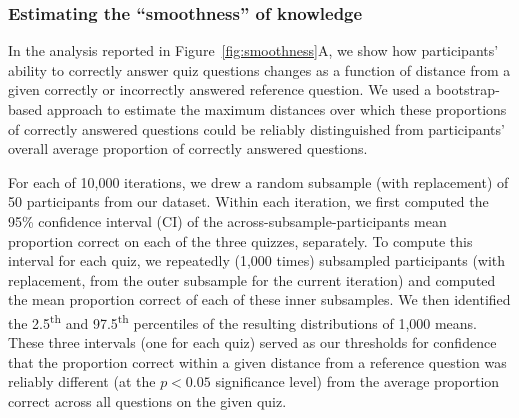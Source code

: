 \documentclass[10pt]{article}
\begin{document}

\subsubsection*{Estimating the ``smoothness'' of knowledge}\label{subsec:smoothness}

In the analysis reported in Figure~\ref{fig:smoothness}A, we show how
participants' ability to correctly answer quiz questions changes as a function
of distance from a given correctly or incorrectly answered reference question.
We used a bootstrap-based approach to estimate the maximum distances over which
these proportions of correctly answered questions could be reliably
distinguished from participants' overall average proportion of correctly
answered questions.

For each of 10,000 iterations, we drew a random subsample (with replacement) of
50 participants from our dataset. Within each iteration, we first computed the
95\% confidence interval (CI) of the across-subsample-participants mean
proportion correct on each of the three quizzes, separately. To compute this
interval for each quiz, we repeatedly (1,000 times) subsampled participants
(with replacement, from the outer subsample for the current iteration) and
computed the mean proportion correct of each of these inner subsamples. We then
identified the 2.5\textsuperscript{th} and 97.5\textsuperscript{th} percentiles
of the resulting distributions of 1,000 means. These three intervals (one for
each quiz) served as our thresholds for confidence that the proportion correct
within a given distance from a reference question was reliably different (at
the $p < 0.05$ significance level) from the average proportion correct across
all questions on the given quiz.
\end{document}
